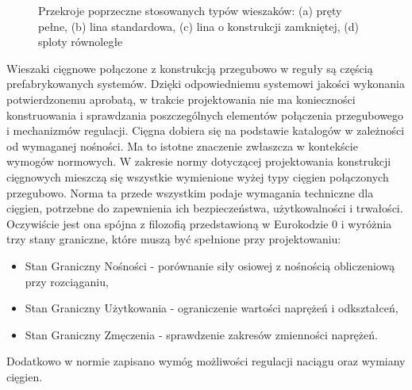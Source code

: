 \begin{figure}[hbt!]
	\centering
	\captionsetup{justification=centering}
	 \quad
	 \quad
	 \quad
	\caption{Przekroje poprzeczne stosowanych typów wieszaków: (a) pręty pełne, (b) lina standardowa, (c) lina o konstrukcji zamkniętej, (d) sploty równoległe}
	\label{fig:bridges_hangers_cs}
\end{figure}

Wieszaki cięgnowe połączone z konstrukcją przegubowo w reguły są częścią prefabrykowanych systemów. Dzięki odpowiedniemu systemowi jakości wykonania potwierdzonemu aprobatą, w trakcie projektowania nie ma konieczności konstruowania i sprawdzania poszczególnych elementów połączenia przegubowego i mechanizmów regulacji. Cięgna dobiera się na podstawie katalogów w zależności od wymaganej nośności. Ma to istotne znaczenie zwłaszcza w kontekście wymogów normowych. W zakresie normy \parencite{PN-EN-1993-1-112008} dotyczącej projektowania konstrukcji cięgnowych mieszczą się wszystkie wymienione wyżej typy cięgien połączonych przegubowo. Norma ta przede wszystkim podaje wymagania techniczne dla cięgien, potrzebne do zapewnienia ich bezpieczeństwa, użytkowalności i trwałości. Oczywiście jest ona spójna z filozofią przedstawioną w Eurokodzie 0 i wyróżnia trzy stany graniczne, które muszą być spełnione przy projektowaniu:
\begin{itemize}
	\item Stan Graniczny Nośności  - porównanie siły osiowej z nośnością obliczeniową przy rozciąganiu,
	\item Stan Graniczny Użytkowania  - ograniczenie wartości naprężeń i odkształceń,
	\item Stan Graniczny Zmęczenia  - sprawdzenie zakresów zmienności naprężeń.
\end{itemize}
Dodatkowo w normie zapisano wymóg możliwości regulacji naciągu oraz wymiany cięgien. 

